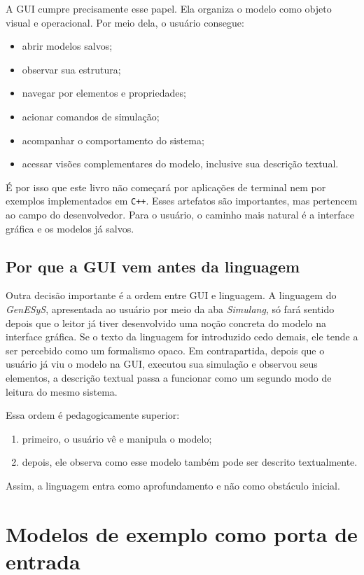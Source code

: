 A GUI cumpre precisamente esse papel. Ela organiza o modelo como objeto visual e operacional. Por meio dela, o usuário consegue:
\begin{itemize}
    \item abrir modelos salvos;
    \item observar sua estrutura;
    \item navegar por elementos e propriedades;
    \item acionar comandos de simulação;
    \item acompanhar o comportamento do sistema;
    \item acessar visões complementares do modelo, inclusive sua descrição textual.
\end{itemize}

É por isso que este livro não começará por aplicações de terminal nem por exemplos implementados em \texttt{C++}. Esses artefatos são importantes, mas pertencem ao campo do desenvolvedor. Para o usuário, o caminho mais natural é a interface gráfica e os modelos já salvos.

\subsection{Por que a GUI vem antes da linguagem}
\label{subsec:cap1_gui_antes_linguagem}

Outra decisão importante é a ordem entre GUI e linguagem. A linguagem do \textit{GenESyS}, apresentada ao usuário por meio da aba \textit{Simulang}, só fará sentido depois que o leitor já tiver desenvolvido uma noção concreta do modelo na interface gráfica. Se o texto da linguagem for introduzido cedo demais, ele tende a ser percebido como um formalismo opaco. Em contrapartida, depois que o usuário já viu o modelo na GUI, executou sua simulação e observou seus elementos, a descrição textual passa a funcionar como um segundo modo de leitura do mesmo sistema.

Essa ordem é pedagogicamente superior:
\begin{enumerate}
    \item primeiro, o usuário vê e manipula o modelo;
    \item depois, ele observa como esse modelo também pode ser descrito textualmente.
\end{enumerate}

Assim, a linguagem entra como aprofundamento e não como obstáculo inicial.

\section{Modelos de exemplo como porta de entrada}
\label{sec:cap1_modelos_exemplo_porta_entrada}

